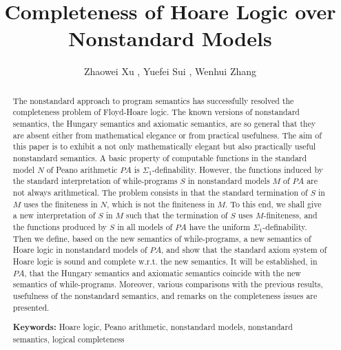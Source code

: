 \documentclass[a4paper,11pt]{article}
\begin{document}
\title{Completeness of Hoare Logic over Nonstandard Models}

\author{
    Zhaowei Xu
    \footnotemark[1]
    \footnotemark[2],
    Yuefei Sui
    \footnotemark[3],
    Wenhui Zhang
    \footnotemark[1]
   }

\renewcommand{\thefootnote}{\fnsymbol{footnote}}




\date{}

\maketitle

\begin{abstract}
 The nonstandard approach to program semantics has successfully resolved the completeness problem of Floyd-Hoare logic. The known versions of nonstandard semantics, the Hungary semantics and axiomatic semantics, are so general that they are absent either from mathematical elegance or from practical usefulness. The aim of this paper is to exhibit a not only mathematically elegant but also practically useful nonstandard semantics. A basic property of computable functions in the standard model $N$ of Peano arithmetic $PA$ is $\Sigma_1$-definability. However, the functions induced by the standard interpretation of while-programs $S$ in nonstandard models $M$ of $PA$ are not always arithmetical. The problem consists in that the standard termination of $S$ in $M$ uses the finiteness in $N$, which is not the finiteness in $M$. To this end, we shall give a new interpretation of $S$ in $M$ such that the termination of $S$ uses $M$-finiteness, and the functions produced by $S$ in all models of $PA$ have the uniform $\Sigma_1$-definability. Then we define, based on the new semantics of while-programs, a new semantics of Hoare logic in nonstandard models of $PA$, and show that the standard axiom system of Hoare logic is sound and complete w.r.t. the new semantics. It will be established, in $PA$, that the Hungary semantics and axiomatic semantics coincide with the new semantics of while-programs. Moreover, various comparisons with the previous results, usefulness of the nonstandard semantics, and remarks on the completeness issues are presented.

\smallskip

\noindent \textbf{Keywords:} Hoare logic, Peano arithmetic, nonstandard models, nonstandard semantics, logical completeness
\end{abstract}
\end{document}
